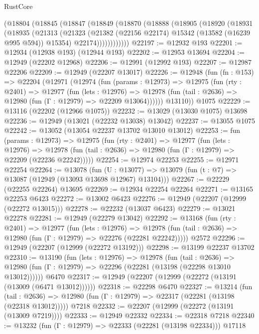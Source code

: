 \begin{lexlean}{RustCore}
\begin{coremodule}
    (@18804
      (@18845
        (@18847
          (@18849
            (@18870
              (@18888
                (@18905
                  (@18920
                    (@18931
                      (@18935
                        (@21313
                          (@21323
                            (@21382 (@22156 @22174) @15342 (@13582 (@16239 @995 @594)) @15354)
                            @22174))))))))))))
@22197 := @12932 @193
@22201 := @12934 (@12938 @193) (@12944 @193)
@22202 := @12953 @13694
@22204 := @12949 (@22202 @12968)
@22206 := @12991 (@12992 @193)
@22207 := @12987 @22206
@22209 := @12949 (@22207 @13017)
@22226 := @12948
    (fun (fn : @153) =>
    @22204
      (@12971
        (@12974
          (fun (params : @12973) =>
          @12975
            (fun (rty : @2401) =>
            @12977
              (fun (lets : @12976) =>
              @12978 (fun (tail : @2636) => @12980 (fun (Γ : @12979) => @22209 @13064))))))
        @13110))
    @1075
@22229 := @13116 (@22202 (@12966 @1075))
@22232 := @13029 (@13030 @1075) @13698
@22236 := @12949 (@13021 (@22232 @13038) @13042)
@22237 := @13055 @1075
@22242 := @13052 (@13054 @22237 @13702 @13010 @13012)
@22253 := fun (params : @12973) =>
  @12975
    (fun (rty : @2401) =>
    @12977
      (fun (lets : @12976) =>
      @12978 (fun (tail : @2636) => @12980 (fun (Γ : @12979) => @22209 (@22236 @22242)))))
@22254 := @12974 @22253
@22255 := @12971 @22254
@22264 := @13078
    (fun (U : @13077) => @13079 (fun (t : @7) => @13087 (@12949 (@13093 @13698 @12967) @13104)))
@22267 := @22229 (@22255 @22264) @13695
@22269 := @12934 @22254 @22264
@22271 := @13165 @22253 @6423
@22272 := @13002 @6423
@22276 := @12949 (@22207 (@12999 (@22272 @13015)))
@22278 := @22232 (@13037 @6423)
@22279 := @13021 @22278
@22281 := @12949 (@22279 @13042)
@22292 := @13168
    (fun (rty : @2401) =>
    @12977
      (fun (lets : @12976) =>
      @12978 (fun (tail : @2636) => @12980 (fun (Γ : @12979) => @22276 (@22281 @22242)))))
    @2572
@22296 := @12949 (@22207 (@12999 (@22272 @13192)))
@22298 := @13199 @22237 @13702
@22310 := @13190
    (fun (lets : @12976) =>
    @12978
      (fun (tail : @2636) =>
      @12980 (fun (Γ : @12979) => @22296 (@22281 (@13198 (@22298 @13010 @13012))))))
    @6470
@22317 := @12949 (@22207 (@12999 (@22272 (@13191 (@13009 (@6471 @13012))))))
@22318 := @22298 @6470
@22327 := @13214
    (fun (tail : @2636) => @12980 (fun (Γ : @12979) => @22317 (@22281 (@13198 (@22318 @13012)))))
    @7218
@22332 := @22207 (@12999 (@22272 (@13191 (@13009 @7219))))
@22333 := @12949 @22332
@22334 := @22318 @7218
@22340 := @13232 (fun (Γ : @12979) => @22333 (@22281 (@13198 @22334))) @17118

\end{coremodule}
\end{lexlean}
